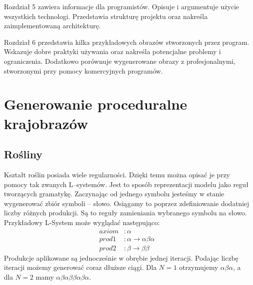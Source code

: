 \documentclass[inz,shortabstract]{iithesis}
\begin{document}
    Rozdział 5 zawiera informacje dla programistów. Opisuje i argumentuje użycie wszystkich technologi. Przedstawia strukturę projektu oraz nakreśla zaimplementowaną architekturę.
    
    Rozdział 6 przedstawia kilka przykładowych obrazów stworzonych przez program. Wskazuje dobre praktyki używania oraz nakreśla potencjalne problemy i ograniczenia. Dodatkowo porównuje wygenerowane obrazy z profesjonalnymi, stworzonymi przy pomocy komercyjnych programów.  
    
    
    
\chapter{Generowanie proceduralne krajobrazów}

    \section{Rośliny}
        Kształt roślin posiada wiele regularności. Dzięki temu można opisać je przy pomocy tak zwanych L--systemów. Jest to sposób reprezentacji modelu jako reguł tworzących gramatykę. Zaczynając od jednego symbolu jesteśmy w stanie wygenerować zbiór symboli -- słowo. Osiągamy to poprzez zdefiniowanie dodatniej liczby różnych produkcji. Są to reguły zamieniania wybranego symbolu na słowo. Przykładowy L-System może wyglądać następująco:
        \begin{align*}
            axiom &: \alpha \\
            prod1 &: \alpha \rightarrow \alpha\beta\alpha \\
            prod2 &: \beta \rightarrow \beta\beta
        \end{align*}
        Produkcje aplikowane są jednocześnie w obrębie jednej iteracji. Podając liczbę iteracji możemy generować coraz dłuższe ciągi. Dla $N = 1$ otrzymujemy $\alpha\beta\alpha$, a dla $N = 2$ mamy $\alpha\beta\alpha\beta\beta\alpha\beta\alpha$.
        
\end{document}
